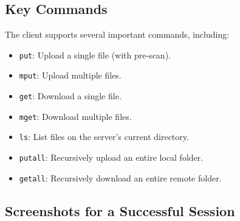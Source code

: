 \subsection{Key Commands}
The client supports several important commands, including:
\begin{itemize}
    \item \texttt{put}: Upload a single file (with pre-scan).
    \item \texttt{mput}: Upload multiple files.
    \item \texttt{get}: Download a single file.
    \item \texttt{mget}: Download multiple files.
    \item \texttt{ls}: List files on the server's current directory.
    \item \texttt{putall}: Recursively upload an entire local folder.
    \item \texttt{getall}: Recursively download an entire remote folder.
\end{itemize}
\subsection{Screenshots for a Successful Session}